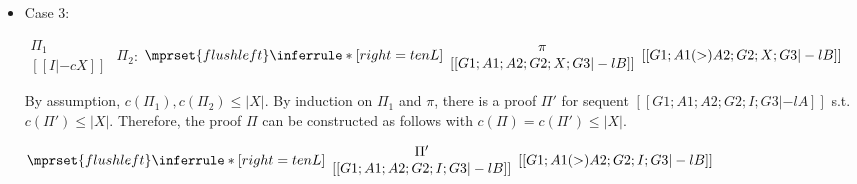 \begin{itemize}
\item Case 3:
      \begin{center}
        \scriptsize
        \begin{math}
          \begin{array}{c}
            \Pi_1 \\
            {[[I |-c X]]}
          \end{array}
        \end{math}
        \qquad\qquad
        $\Pi_2$:
        \begin{math}
          $$\mprset{flushleft}
          \inferrule* [right={\tiny tenL}] {
            {
              \begin{array}{c}
                \pi \\
                {[[G1; A1; A2; G2; X; G3 |-l B]]}
              \end{array}
            }
          }{[[G1; A1 (>) A2; G2; X; G3 |-l B]]}
        \end{math}
      \end{center}
      By assumption, $c(\Pi_1),c(\Pi_2)\leq |X|$. By induction on $\Pi_1$
      and $\pi$, there is a proof $\Pi'$ for sequent
      $[[G1; A1; A2; G2; I; G3 |-l A]]$ s.t. $c(\Pi') \leq |X|$. Therefore,
      the proof $\Pi$ can be constructed as follows with
      $c(\Pi) = c(\Pi') \leq |X|$.
      \begin{center}
        \scriptsize
        \begin{math}
          $$\mprset{flushleft}
          \inferrule* [right={\tiny tenL}] {
            {
              \begin{array}{c}
                \Pi' \\
                {[[G1; A1; A2; G2; I; G3 |-l B]]}
              \end{array}
            }
          }{[[G1; A1 (>) A2; G2; I; G3 |-l B]]}
        \end{math}
      \end{center}


\end{itemize}
